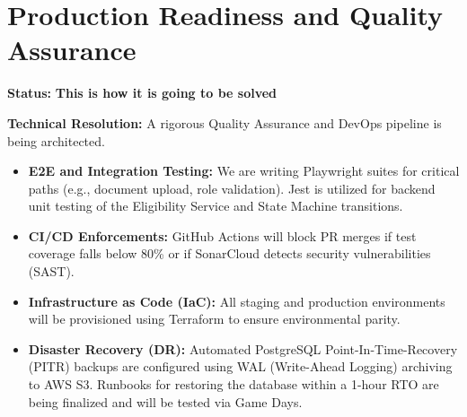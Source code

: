 \documentclass[12pt, a4paper]{article}
\begin{document}
\section{Production Readiness and Quality Assurance}
\textbf{Status:} \textcolor{planned}{\textbf{This is how it is going to be solved}}

\textbf{Technical Resolution:}
A rigorous Quality Assurance and DevOps pipeline is being architected.
\begin{itemize}
    \item \textbf{E2E and Integration Testing:} We are writing Playwright suites for critical paths (e.g., document upload, role validation). Jest is utilized for backend unit testing of the Eligibility Service and State Machine transitions.
    \item \textbf{CI/CD Enforcements:} GitHub Actions will block PR merges if test coverage falls below 80\% or if SonarCloud detects security vulnerabilities (SAST).
    \item \textbf{Infrastructure as Code (IaC):} All staging and production environments will be provisioned using Terraform to ensure environmental parity.
    \item \textbf{Disaster Recovery (DR):} Automated PostgreSQL Point-In-Time-Recovery (PITR) backups are configured using WAL (Write-Ahead Logging) archiving to AWS S3. Runbooks for restoring the database within a 1-hour RTO are being finalized and will be tested via Game Days.
\end{itemize}
\end{document}
